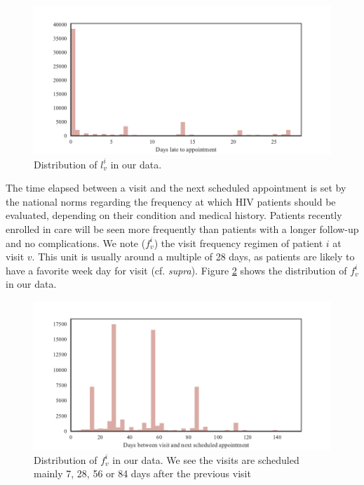 \begin{center}
\begin{figure}[ht]
\includegraphics[width=\textwidth]{figure/time_late_to_appointment.pdf}
\caption{Distribution of $l_v^i$ in our data.}
\label{fig:late_days}
\end{figure}
\end{center}

The time elapsed between a visit and the next scheduled appointment is set by the national norms regarding the frequency at which HIV patients should be evaluated, depending on their condition and medical history. Patients recently enrolled in care will be seen more frequently than patients with a longer follow-up and no complications. We note ($f_v^i$) the visit frequency regimen of patient $i$ at visit $v$. This unit is usually around a multiple of 28 days, as patients are likely to have a favorite week day for visit (cf. \textit{supra}). Figure \ref{fig:schedule_days} shows the distribution of $f_v^i$ in our data.

\begin{center}
\begin{figure}[ht]
\includegraphics[width=\textwidth]{figure/time_to_appointment.pdf}
\caption{Distribution of $f_v^i$ in our data. We see the visits are scheduled mainly 7, 28, 56 or 84 days after the previous visit}
\label{fig:schedule_days}
\end{figure}
\end{center}

